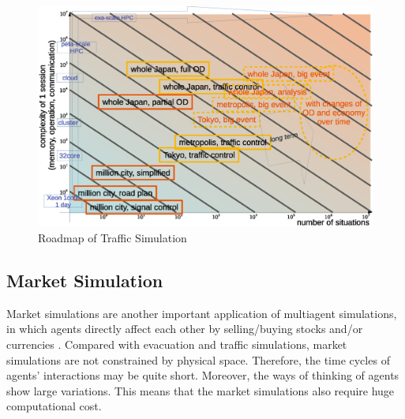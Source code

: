 \begin{figure}
  \centering
  \includegraphics[width=.98\linewidth]{Figs.noda/figure2-5.eps}
  \caption{Roadmap of Traffic Simulation}
  \label{fig:Figure-5}
\end{figure}


\subsection{Market Simulation}

Market simulations are another important application of multiagent
simulations,
in which agents directly affect each other by selling/buying stocks
and/or currencies \cite{Kawakubo2014a}.
Compared with evacuation and traffic simulations,
market simulations are not constrained by physical space.
Therefore, the time cycles of agents' interactions may be quite short.
Moreover, the ways of thinking of agents show large variations.
This means that the market simulations also require huge
computational cost.

